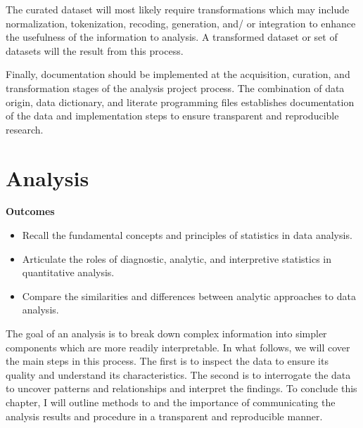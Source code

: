 \documentclass[
  letterpaper,
  krantz1]{latex/krantz-mod}
\providecommand{\tightlist}{%
  \setlength{\itemsep}{0pt}\setlength{\parskip}{0pt}}\usepackage{longtable,booktabs,array}
\newcommand{\setDOI}[1]{\gdef\doi{#1}}
\theoremstyle{definition}
\theoremstyle{definition}
\theoremstyle{remark}
\begin{document}
The curated dataset will most likely require transformations which may
include normalization, tokenization, recoding, generation, and/ or
integration to enhance the usefulness of the information to analysis. A
transformed dataset or set of datasets will the result from this
process.

Finally, documentation should be implemented at the acquisition,
curation, and transformation stages of the analysis project process. The
combination of data origin, data dictionary, and literate programming
files establishes documentation of the data and implementation steps to
ensure transparent and reproducible research.

\chapter{Analysis}\label{sec-analysis-chapter}

\setDOI{10.4324/9781003393764.3}
\thispagestyle{chapterfirstpage}

\begin{tcolorbox}[enhanced jigsaw, leftrule=.75mm, colframe=quarto-callout-color-frame, left=2mm, colback=white, toprule=.15mm, breakable, arc=.35mm, opacityback=0, bottomrule=.15mm, rightrule=.15mm]

\textbf{ Outcomes}

\begin{itemize}
\tightlist
\item
  Recall the fundamental concepts and principles of statistics in data
  analysis.
\item
  Articulate the roles of diagnostic, analytic, and interpretive
  statistics in quantitative analysis.
\item
  Compare the similarities and differences between analytic approaches
  to data analysis.
\end{itemize}

\end{tcolorbox}

The goal of an analysis is to break down complex information into
simpler components which are more readily interpretable. In what
follows, we will cover the main steps in this process. The first is to
inspect the data to ensure its quality and understand its
characteristics. The second is to interrogate the data to uncover
patterns and relationships and interpret the findings. To conclude this
chapter, I will outline methods to and the importance of communicating
the analysis results and procedure in a transparent and reproducible
manner.
\end{document}
